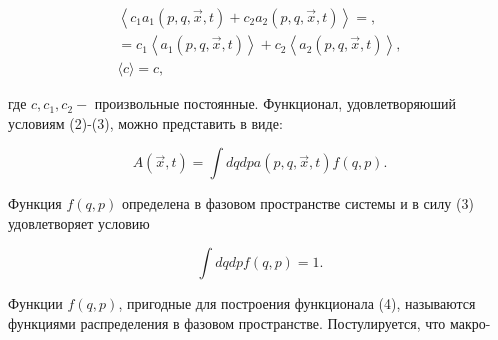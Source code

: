 \documentclass[10pt]{article}
\begin{document}
\[

\begin{gathered}

\left\langle c_{1} a_{1}(p, q, \vec{x}, t)+c_{2} a_{2}(p, q, \vec{x}, t)\right\rangle=, \\

=c_{1}\left\langle a_{1}(p, q, \vec{x}, t)\right\rangle+c_{2}\left\langle a_{2}(p, q, \vec{x}, t)\right\rangle, \\

\langle c\rangle=c,

\end{gathered}

\]



где $c, c_{1}, c_{2}-$ произвольные постоянные. Функционал, удовлетворяюший условиям (2)-(3), можно представить в виде:



\[

A(\vec{x}, t)=\int d q d p a(p, q, \vec{x}, t) f(q, p) .

\]



Функция $f(q, p)$ определена в фазовом пространстве системы и в силу (3) удовлетворяет условию



\[

\int d q d p f(q, p)=1 .

\]



Функции $f(q, p)$, пригодные для построения функционала (4), называются функциями распределения в фазовом пространстве. Постулируется, что макро-
\end{document}
